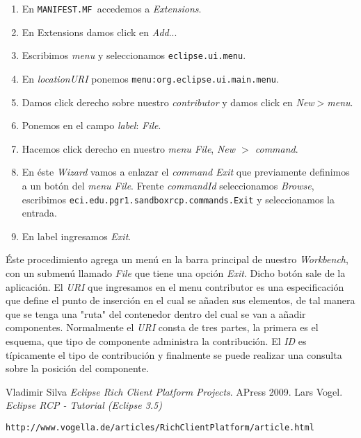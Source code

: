 \documentclass[journal]{IEEEtran}
\newcommand{\mnf}{\texttt{MANIFEST.MF~}}
\begin{document}
\begin{enumerate}
 \item En \mnf accedemos a \textit{Extensions}.
 \item En Extensions damos click en \textit{Add}...
 \item Escribimos \textit{menu} y seleccionamos \texttt{eclipse.ui.menu}.
 \item En \textit{locationURI} ponemos \texttt{menu:org.eclipse.ui.main.menu}.
 \item Damos click derecho sobre nuestro \textit{contributor} y damos click en \textit{New$>$menu}.
 \item Ponemos en el campo \textit{label}: \textit{File}.
 \item Hacemos click derecho en nuestro \textit{menu File}, \textit{New $>$ command}.
 \item En éste \textit{Wizard} vamos a enlazar el \textit{command Exit} que previamente definimos a un botón del \textit{menu File}. Frente \textit{commandId} seleccionamos \textit{Browse}, 
 escribimos \texttt{eci.edu.pgr1.sandboxrcp.commands.Exit} y seleccionamos la entrada.
 \item En label ingresamos \textit{Exit}.
\end{enumerate}
Éste procedimiento agrega un menú en la barra principal de nuestro \textit{Workbench}, con un submenú llamado \textit{File} que tiene una opción \textit{Exit}. Dicho botón sale de la aplicación.
El \textit{URI} que ingresamos en el menu contributor es una especificación que define el punto de inserción en el cual se añaden sus elementos, de tal manera que se tenga una 
"ruta" del contenedor dentro del cual se van a añadir componentes.
Normalmente el \textit{URI} consta de tres partes, la primera es el esquema, que tipo de componente administra la contribución. El \textit{ID} es típicamente el tipo de contribución y 
finalmente se puede realizar una consulta sobre la posición del componente.

\renewcommand{\refname}{Bibliografía}
\begin{thebibliography}{50}
 Vladimir Silva \textit{Eclipse Rich Client Platform Projects}. APress 2009.
 Lars Vogel. \textit{Eclipse RCP - Tutorial (Eclipse 3.5)}\\
\begin{scriptsize}  \verb|http://www.vogella.de/articles/RichClientPlatform/article.html|\end{scriptsize}
\end{thebibliography}
\end{document}
